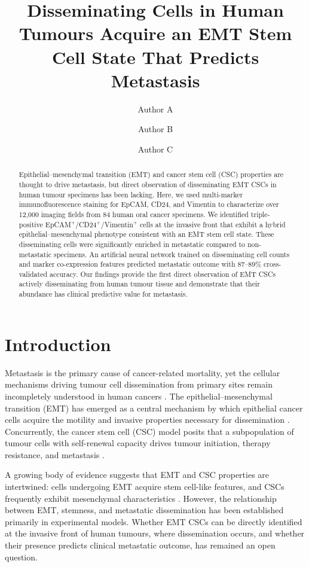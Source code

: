 \documentclass[11pt]{article}
\title{Disseminating Cells in Human Tumours Acquire an EMT Stem Cell State That Predicts Metastasis}
\author[1]{Author A}
\author[1]{Author B}
\author[1,2]{Author C}
\affil[1]{Department of Oncology, Medical University of Graz, Graz, Austria}
\affil[2]{Institute of Pathology, Medical University of Graz, Graz, Austria}
\date{}
\begin{document}
\maketitle

\begin{abstract}
Epithelial--mesenchymal transition (EMT) and cancer stem cell (CSC) properties are thought to drive metastasis, but direct observation of disseminating EMT CSCs in human tumour specimens has been lacking. Here, we used multi-marker immunofluorescence staining for EpCAM, CD24, and Vimentin to characterize over 12,000 imaging fields from 84 human oral cancer specimens. We identified triple-positive EpCAM$^+$/CD24$^+$/Vimentin$^+$ cells at the invasive front that exhibit a hybrid epithelial--mesenchymal phenotype consistent with an EMT stem cell state. These disseminating cells were significantly enriched in metastatic compared to non-metastatic specimens. An artificial neural network trained on disseminating cell counts and marker co-expression features predicted metastatic outcome with 87--89\% cross-validated accuracy. Our findings provide the first direct observation of EMT CSCs actively disseminating from human tumour tissue and demonstrate that their abundance has clinical predictive value for metastasis.
\end{abstract}

\section{Introduction}

Metastasis is the primary cause of cancer-related mortality, yet the cellular mechanisms driving tumour cell dissemination from primary sites remain incompletely understood in human cancers \citep{lambert2017emerging}. The epithelial--mesenchymal transition (EMT) has emerged as a central mechanism by which epithelial cancer cells acquire the motility and invasive properties necessary for dissemination \citep{nieto2016emt}. Concurrently, the cancer stem cell (CSC) model posits that a subpopulation of tumour cells with self-renewal capacity drives tumour initiation, therapy resistance, and metastasis \citep{batlle2017cancer}.

A growing body of evidence suggests that EMT and CSC properties are intertwined: cells undergoing EMT acquire stem cell-like features, and CSCs frequently exhibit mesenchymal characteristics \citep{mani2008mesenchyme}. However, the relationship between EMT, stemness, and metastatic dissemination has been established primarily in experimental models. Whether EMT CSCs can be directly identified at the invasive front of human tumours, where dissemination occurs, and whether their presence predicts clinical metastatic outcome, has remained an open question.
\end{document}
